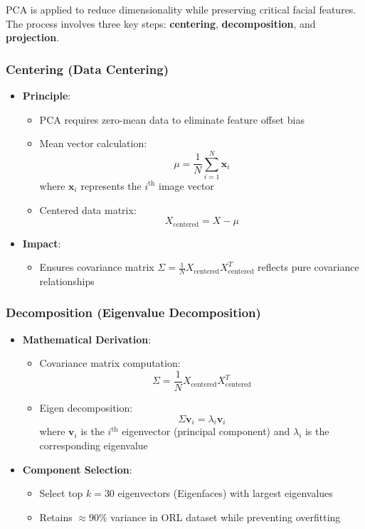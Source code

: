 \documentclass{article}
\begin{document}
	PCA is applied to reduce dimensionality while preserving critical facial features. The process involves three key steps: \textbf{centering}, \textbf{decomposition}, and \textbf{projection}.
	

	\subsubsection{Centering (Data Centering)}
	\begin{itemize}
		\item \textbf{Principle}:
		\begin{itemize}
			\item PCA requires zero-mean data to eliminate feature offset bias
			\item Mean vector calculation: 
			\[
			\mu = \frac{1}{N} \sum_{i=1}^{N} \mathbf{x}_i
			\]
			where $\mathbf{x}_i$ represents the $i^{\text{th}}$ image vector
			\item Centered data matrix: 
			\[
			X_{\text{centered}} = X - \mu
			\]
		\end{itemize}
		
		\item \textbf{Impact}:
		\begin{itemize}
			\item Ensures covariance matrix $\Sigma = \frac{1}{N} X_{\text{centered}} X_{\text{centered}}^T$ reflects pure covariance relationships
		\end{itemize}
	\end{itemize}
	
	\subsubsection{Decomposition (Eigenvalue Decomposition)}
	\begin{itemize}
		\item \textbf{Mathematical Derivation}:
		\begin{itemize}
			\item Covariance matrix computation: 
			\[
			\Sigma = \frac{1}{N} X_{\text{centered}} X_{\text{centered}}^T
			\]
			\item Eigen decomposition: 
			\[
			\Sigma \mathbf{v}_i = \lambda_i \mathbf{v}_i
			\]
			where $\mathbf{v}_i$ is the $i^{\text{th}}$ eigenvector (principal component) and $\lambda_i$ is the corresponding eigenvalue
		\end{itemize}
		
		\item \textbf{Component Selection}:
		\begin{itemize}
			\item Select top $k=30$ eigenvectors (Eigenfaces) with largest eigenvalues
			\item Retains $\approx 90\%$ variance in ORL dataset while preventing overfitting 
		\end{itemize}
	\end{itemize}
	
\end{document}
